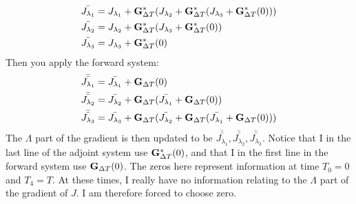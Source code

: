 \documentclass[11pt,a4paper]{article}
\begin{document}
\begin{align*}
\bar{J_{\lambda_1}} &=J_{\lambda_1} +\bold{G}_{\Delta T}^*(J_{\lambda_2} + \bold{G}_{\Delta T}^*(J_{\lambda_3} + \bold{G}_{\Delta T}^*(0)))\\
\bar{J_{\lambda_2}} &=J_{\lambda_2} + \bold{G}_{\Delta T}^*(J_{\lambda_3} + \bold{G}_{\Delta T}^*(0))\\
\bar{J_{\lambda_3}} &=J_{\lambda_3} + \bold{G}_{\Delta T}^*(0) \\
\end{align*} 
Then you apply the forward system:
\begin{align*}
\bar{\bar{J_{\lambda_1}}}&=\bar{J_{\lambda_1}} + \bold{G}_{\Delta T}(0) \\
\bar{\bar{J_{\lambda_2}}}&=\bar{J_{\lambda_2}}+ \bold{G}_{\Delta T}(\bar{J_{\lambda_1}} + \bold{G}_{\Delta T}(0)) \\
\bar{\bar{J_{\lambda_3}}}&=\bar{J_{\lambda_3}} + \bold{G}_{\Delta T}(\bar{J_{\lambda_2}}+ \bold{G}_{\Delta T}(\bar{J_{\lambda_1}} + \bold{G}_{\Delta T}(0)))
\end{align*} 
The $\Lambda$ part of the gradient is then updated to be $\bar{\bar{J_{\lambda_1}}}, \bar{\bar{J_{\lambda_2}}},\bar{\bar{J_{\lambda_3}}}$. Notice that I in the last line of the adjoint system use $\bold{G}_{\Delta T}^*(0)$, and that I in the first line in the forward system use $\bold{G}_{\Delta T}(0)$. The zeros here represent information at time $T_0=0$ and $T_4=T$. At these times, I really have no information relating to the $\Lambda$ part of the gradient of $J$. I am therefore forced to choose zero.
\end{document}
